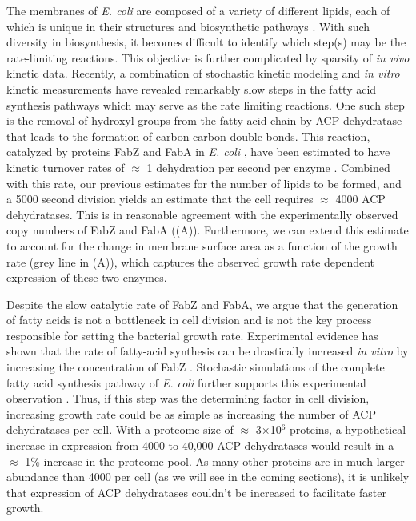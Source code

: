 The membranes of \textit{E. coli} are composed of a variety of different lipids,
each of which is unique in their structures and biosynthetic pathways
\citep{sohlenkamp2016}. With such diversity in biosynthesis, it becomes
difficult to identify which step(s) may be the rate-limiting reactions. This
objective is further complicated by sparsity of \textit{in vivo} kinetic data.
Recently, a combination of stochastic kinetic modeling \citep{ruppe2018} and
\textit{in vitro} kinetic measurements \citep{ranganathan2012, yu2011} have
revealed remarkably slow steps in the fatty acid synthesis pathways which may
serve as the rate limiting reactions. One such step is the removal of hydroxyl
groups from the fatty-acid chain by ACP dehydratase that leads to the formation of
carbon-carbon double bonds. This reaction, catalyzed by proteins FabZ and
FabA in \textit{E. coli} \citep{yu2011}, have been estimated to have kinetic
turnover rates of $\approx$ 1 dehydration per second per enzyme
\citep{ruppe2018}. Combined with this rate, our previous estimates for the
number of lipids to be formed, and a 5000 second division yields an estimate
that the cell requires $\approx$ 4000 ACP dehydratases. This is in
reasonable agreement with the experimentally observed copy numbers of FabZ and
FabA ((A)). Furthermore, we can extend this estimate to
account for the change in membrane surface area as a function of the growth rate
(grey line in (A)), which captures the observed growth rate
dependent expression of these two enzymes.

Despite the slow catalytic rate of FabZ and FabA, we argue that the generation
of fatty acids is not a bottleneck in cell division and is not the key process
responsible for setting the bacterial growth rate. Experimental evidence has
shown that the rate of fatty-acid synthesis can be drastically increased
\textit{in vitro} by increasing the concentration of FabZ \cite{yu2011}.
Stochastic simulations of the complete fatty acid synthesis pathway of
\textit{E. coli} further supports this experimental observation
\cite{ruppe2018}. Thus, if this step was the determining factor in cell
division, increasing growth rate could be as simple as increasing the number of
ACP dehydratases per cell. With a proteome size of $\approx$ 3$\times$10$^6$
proteins, a hypothetical increase in expression from 4000 to 40,000 ACP
dehydratases would result in a $\approx$ 1\% increase in the proteome pool. As
many other  proteins are in much larger abundance than 4000 per cell (as we will
see in the coming sections), it is unlikely that expression of ACP dehydratases
couldn't be increased to facilitate faster growth.


